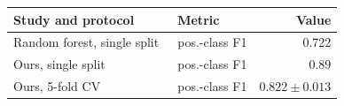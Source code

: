 \begin{tabular}{@{}llr@{}}
\toprule
Study and protocol & Metric & Value \\
\midrule
Random forest, single split~\cite{physicsinformed2026} & pos.-class F1 & 0.722 \\
Ours, single split & pos.-class F1 & 0.89 \\
Ours, 5-fold CV & pos.-class F1 & $0.822 \pm 0.013$ \\
\bottomrule
\end{tabular}

